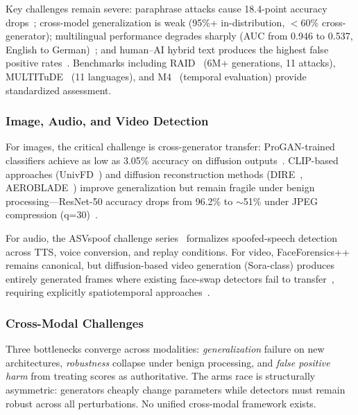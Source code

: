 Key challenges remain severe: paraphrase attacks cause 18.4-point accuracy drops~\cite{dugan2024raid}; cross-model generalization is weak (95\%+ in-distribution, $<$60\% cross-generator); multilingual performance degrades sharply (AUC from 0.946 to 0.537, English to German)~\cite{macko2023multitude}; and human--AI hybrid text produces the highest false positive rates~\cite{turnitin2024}. Benchmarks including RAID~\cite{dugan2024raid} (6M+ generations, 11 attacks), MULTITuDE~\cite{macko2023multitude} (11 languages), and M4~\cite{wang2024m4} (temporal evaluation) provide standardized assessment.

\subsubsection{Image, Audio, and Video Detection}
\label{sec:detect-multimodal}

For images, the critical challenge is cross-generator transfer: ProGAN-trained classifiers achieve as low as 3.05\% accuracy on diffusion outputs~\cite{ojha2023univfd}. CLIP-based approaches (UnivFD~\cite{ojha2023univfd}) and diffusion reconstruction methods (DIRE~\cite{wang2023dire}, AEROBLADE~\cite{ricker2024aeroblade}) improve generalization but remain fragile under benign processing---ResNet-50 accuracy drops from 96.2\% to $\sim$51\% under JPEG compression (q=30)~\cite{zhu2023genimage}.

For audio, the ASVspoof challenge series~\cite{asvspoof2019,asvspoof2021} formalizes spoofed-speech detection across TTS, voice conversion, and replay conditions. For video, FaceForensics++~\cite{rossler2019faceforensics} remains canonical, but diffusion-based video generation (Sora-class) produces entirely generated frames where existing face-swap detectors fail to transfer~\cite{cai2024beyonddeepfake}, requiring explicitly spatiotemporal approaches~\cite{stall2026}.

\subsubsection{Cross-Modal Challenges}
\label{sec:detect-cross}

Three bottlenecks converge across modalities: \emph{generalization} failure on new architectures, \emph{robustness} collapse under benign processing, and \emph{false positive harm} from treating scores as authoritative. The arms race is structurally asymmetric: generators cheaply change parameters while detectors must remain robust across all perturbations. No unified cross-modal framework exists.

